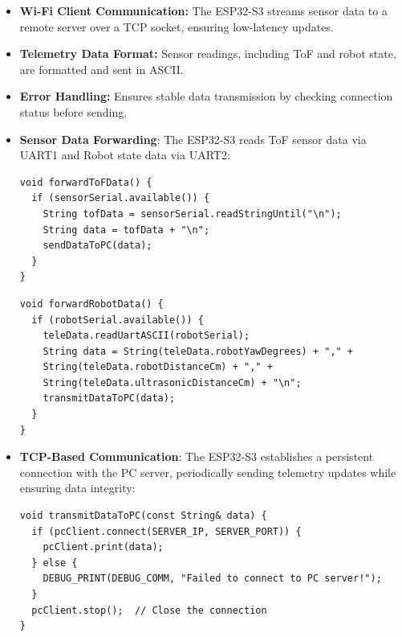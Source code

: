 \begin{itemize}
	\item \textbf{Wi-Fi Client Communication:} The ESP32-S3 streams sensor data to a remote server over a TCP socket, ensuring low-latency updates.
	\item \textbf{Telemetry Data Format:} Sensor readings, including ToF and robot state, are formatted and sent in ASCII.  
	\item \textbf{Error Handling:} Ensures stable data transmission by checking connection status before sending.  

	
	\item \textbf{Sensor Data Forwarding}: The ESP32-S3 reads ToF sensor data via UART1 and Robot state data via UART2:
	\begin{lstlisting}[style=cppstyle2]		
void forwardToFData() {
  if (sensorSerial.available()) {
	String tofData = sensorSerial.readStringUntil("\n");
	String data = tofData + "\n";
	sendDataToPC(data);
  }
}
	\end{lstlisting}
	\begin{lstlisting}[style=cppstyle2]		
void forwardRobotData() {
  if (robotSerial.available()) {
	teleData.readUartASCII(robotSerial);
	String data = String(teleData.robotYawDegrees) + "," +
	String(teleData.robotDistanceCm) + "," +
	String(teleData.ultrasonicDistanceCm) + "\n";
	transmitDataToPC(data);
  }
}
	\end{lstlisting}
	\item \textbf{TCP-Based Communication}: The ESP32-S3 establishes a persistent connection with the PC server, periodically sending telemetry updates while ensuring data integrity:
	\begin{lstlisting}[style=cppstyle2]
void transmitDataToPC(const String& data) {
  if (pcClient.connect(SERVER_IP, SERVER_PORT)) {
	pcClient.print(data);
  } else {
	DEBUG_PRINT(DEBUG_COMM, "Failed to connect to PC server!");
  }
  pcClient.stop();  // Close the connection
}
	\end{lstlisting}
\end{itemize}

